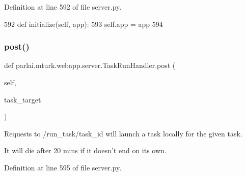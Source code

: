 Definition at line 592 of file server.\+py.


\begin{DoxyCode}
592     \textcolor{keyword}{def }initialize(self, app):
593         self.app = app
594 
\end{DoxyCode}
\mbox{\label{classparlai_1_1mturk_1_1webapp_1_1server_1_1TaskRunHandler_a957a29eb2fcfec6fba5890470387e1d0}} 
\subsubsection{\texorpdfstring{post()}{post()}}
{\footnotesize\ttfamily def parlai.\+mturk.\+webapp.\+server.\+Task\+Run\+Handler.\+post (\begin{DoxyParamCaption}\item[{}]{self,  }\item[{}]{task\+\_\+target }\end{DoxyParamCaption})}

\begin{DoxyVerb}Requests to /run_task/{task_id} will launch a task locally for the given task.

It will die after 20 mins if it doesn't end on its own.
\end{DoxyVerb}
 

Definition at line 595 of file server.\+py.


